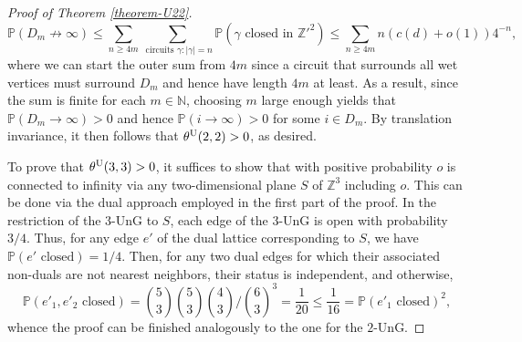 \documentclass[a4paper, oneside, 11pt]{amsart}
\newcommand{\N}{\mathbb{N}}
\theoremstyle{definition}
\renewcommand{\P}{\mathbb{P}}
\newcommand{\1}{\mathbbm{1}}
\newcommand{\0}{\mathbf{o}}
\newcommand{\Z}{\mathbb{Z}}
\newcommand*{\be}{\begin{equation}}
\newcommand*{\ee}{\end{equation}}
\numberwithin{equation}{section}
\begin{document}
\begin{proof}[Proof of Theorem \ref{theorem-U22}]
    \be 
    \P(D_m \not\to \infty )\leq \sum_{n\ge4m} \sum_{\text{ circuits }\gamma\colon |\gamma|=n}\P(\gamma\text{ closed in }\Z'^2)\leq \sum_{n\ge4m} n(c(d)+o(1))4^{-n},
    \ee 
    where we can start the outer sum from $4m$ since a circuit that surrounds all wet vertices must surround $D_m$ and hence have length $4m$ at least. 
    As a result, since the sum is finite for each $m\in\N$, choosing $m$ large enough yields that $\P(D_m\to \infty)>0$ and hence $\P(i\to \infty)>0$ for some $i\in D_m$. By translation invariance, it then follows that $\theta^{\rm U}(2,2)>0$, as desired.

    To prove that $\theta^{\rm U}(3,3)>0$, it suffices to show that with positive probability $o$ is connected to infinity via any two-dimensional plane $S$ of $\Z^3$ including $o$. This can be done via the dual approach employed in the first part of the proof. In the restriction of the $3$-UnG to $S$, each edge of the $3$-UnG is open with probability $3/4$. Thus, for any edge $e'$ of the dual lattice corresponding to $S$, we have $\P(e'\text{ closed})=1/4$. Then, for any two dual edges for which their associated non-duals are not nearest neighbors, their status is independent, and otherwise,
    \[ 
        \P(e'_1,e'_2\text{ closed}) = \binom{5}{3}\binom{5}{3}\binom{4}{3}\Big/\binom{6}{3}^3 = \frac{1}{20}\leq \frac{1}{16} = \P(e'_1\text{ closed})^2,
    \]
whence the proof can be finished analogously to the one for the $2$-UnG. 
\end{proof}
\end{document}
